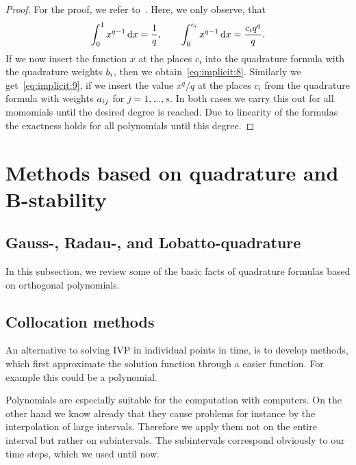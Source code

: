 


\begin{proof}
  For the proof, we refer to~\cite[Ch. II, Theorem
  7.4]{HairerNorsettWanner93}. Here, we only observe, that
  \begin{gather*}
    \int_0^1 x^{q-1} \,\mathrm{d} x = \frac1{q}, \qquad
    \int_0^{c_i} x^{q-1} \,\mathrm{d} x = \frac{c_i q^{q}}{q}.
  \end{gather*}
  If we now insert the function $x$ at the places $c_i$ into the
  quadrature formula with the quadrature weights $b_i$, then we
  obtain~\eqref{eq:implicit:8}. Similarly we get~\eqref{eq:implicit:9}, if we insert the value $x^{q}/q$ at
  the places $c_i$ from the quadrature formula with weights
  $a_{ij}$ for $j=1,\dots,s$. In both cases we carry this out for
  all momomials until the desired degree is reached.  Due to linearity
  of the formulas the exactness holds for all polynomials until this
  degree.
\end{proof}

\section{Methods based on quadrature and B-stability}

\subsection{Gauss-, Radau-, and Lobatto-quadrature}

\begin{intro}
  In this subsection, we review some of the basic facts of quadrature
  formulas based on orthogonal polynomials.
\end{intro}





\subsection{Collocation methods}
\begin{intro}
  An alternative to solving IVP in individual points in time, is to
  develop methods, which first approximate the solution function
  through a easier function. For example this could be a polynomial.
  
  Polynomials are especially suitable for the computation with
  computers.  On the other hand we know already that they cause
  problems for instance by the interpolation of large intervals.
  Therefore we apply them not on the entire interval but rather on
  subintervals. The subintervals correspond obviously to our time
  steps, which we used until now.
\end{intro}

